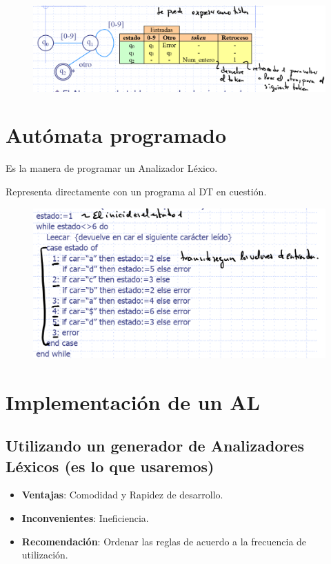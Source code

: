 \documentclass[12pt]{report} %
\begin{document}
\begin{figure}[H]
	{\includegraphics[scale=.25]{Untitled 31.png}}
\end{figure}

\section{Autómata programado}

Es la manera de programar un Analizador Léxico.

Representa directamente con un programa al DT en cuestión.

\begin{figure}[H]
	{\includegraphics[scale=.3]{Untitled 32.png}}
\end{figure}

\section{Implementación de un AL}

\subsection{Utilizando un generador de Analizadores Léxicos (es lo que usaremos)}

\begin{itemize}
\item
  \textbf{Ventajas}: Comodidad y Rapidez de desarrollo.
\item
  \textbf{Inconvenientes}: Ineficiencia.
\item
  \textbf{Recomendación}: Ordenar las reglas de acuerdo a la frecuencia
  de utilización.
\end{itemize}
\end{document}
